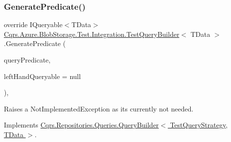 \subsubsection{\texorpdfstring{Generate\+Predicate()}{GeneratePredicate()}}
{\footnotesize\ttfamily override I\+Queryable$<$T\+Data$>$ \hyperlink{classCqrs_1_1Azure_1_1BlobStorage_1_1Test_1_1Integration_1_1TestQueryBuilder}{Cqrs.\+Azure.\+Blob\+Storage.\+Test.\+Integration.\+Test\+Query\+Builder}$<$ T\+Data $>$.Generate\+Predicate (\begin{DoxyParamCaption}\item[{\hyperlink{classCqrs_1_1Repositories_1_1Queries_1_1QueryPredicate}{Query\+Predicate}}]{query\+Predicate,  }\item[{I\+Queryable$<$ T\+Data $>$}]{left\+Hand\+Queryable = {\ttfamily null} }\end{DoxyParamCaption})\hspace{0.3cm}{\ttfamily [protected]}, {\ttfamily [virtual]}}



Raises a Not\+Implemented\+Exception as it\textquotesingle{}s currently not needed. 



Implements \hyperlink{classCqrs_1_1Repositories_1_1Queries_1_1QueryBuilder_aa38989a8b4808c7c73e7cf038b535ea7_aa38989a8b4808c7c73e7cf038b535ea7}{Cqrs.\+Repositories.\+Queries.\+Query\+Builder$<$ Test\+Query\+Strategy, T\+Data $>$}.

